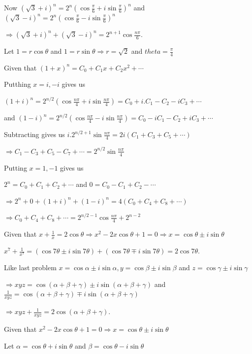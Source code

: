   Now $(\sqrt{3} + i)^n = 2^n(\cos\frac{\pi}{6} + i\sin\frac{\pi}{6})^n$ and $(\sqrt{3} - i)^n =
  2^n(\cos\frac{\pi}{6} - i\sin\frac{\pi}{6})^n$

  $\Rightarrow (\sqrt{3} + i)^n + (\sqrt{3} - i)^n = 2^{n + 1}\cos\frac{n\pi}{6}$.
\item Let $1 = r\cos\theta$ and $1 = r\sin\theta\Rightarrow r = \sqrt{2}$ and $theta = \frac{\pi}{4}$

  Given that $(1 + x)^n = C_0 + C_1x + C_2x^2 + \cdots$

  Putthing $x = i, -i$ gives us

  $(1 + i)^n = 2^{n/2}\left(\cos\frac{n\pi}{4} + i\sin\frac{n\pi}{4}\right) = C_0 + i.C_1 - C_2 -iC_3
  + \cdots$

  and $(1 - i)^n = 2^{n/2}\left(\cos\frac{n\pi}{4} - i\sin\frac{n\pi}{4}\right) = C_0 - iC_1 - C_2 + iC_3
  + \cdots$

  Subtracting gives us $i.2^{n/2 + 1}\sin\frac{n\pi}{4} = 2i(C_1 + C_3 + C_5 + \cdots)$

  $\Rightarrow C_1 - C_3 + C_5 - C_7 + \cdots = 2^{n/2}\sin\frac{n\pi}{4}$

  Putting $x = 1, -1$ gives us

  $2^n = C_0 + C_1 + C_2 + \cdots$ and $0 = C_0 - C_1 + C_2 - \cdots$

  $\Rightarrow 2^n + 0 + (1 + i)^n + (1 - i)^n = 4\left(C_0 + C_4 + C_8 + \cdots\right)$

  $\Rightarrow C_0 + C_4 + C_8 + \cdots = 2^{n/2 - 1}\cos\frac{n\pi}{4} + 2^{n - 2}$
\item Given that $x + \frac{1}{x} = 2\cos\theta \Rightarrow x^2 - 2x\cos\theta + 1 = 0 \Rightarrow x
  = \cos\theta\pm i\sin\theta$

  $x^7 + \frac{1}{x^7} = (\cos7\theta\pm i\sin7\theta) + (\cos7\theta\mp i\sin7\theta) = 2\cos7\theta$.
\item Like last problem $x = \cos\alpha\pm i\sin\alpha, y = \cos\beta\pm i\sin\beta$ and $z = \cos\gamma\pm
  i\sin\gamma$

  $\Rightarrow xyz = \cos(\alpha + \beta + \gamma)\pm i\sin(\alpha + \beta + \gamma)$ and $\frac{1}{xyz}
  = \cos(\alpha + \beta + \gamma)\mp i\sin(\alpha + \beta + \gamma)$

  $\Rightarrow xyz + \frac{1}{xyz} = 2\cos(\alpha + \beta + \gamma)$.
\item Given that $x^2 - 2x\cos\theta + 1 = 0\Rightarrow x = \cos\theta\pm i\sin\theta$

  Let $\alpha = \cos\theta + i\sin\theta$ and $\beta = \cos\theta - i\sin\theta$


